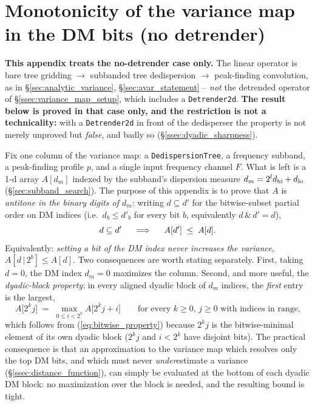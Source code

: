 \documentclass{article}
\numberwithin{equation}{section}   %
\begin{document}
\clearpage

\section{Monotonicity of the variance map in the DM bits (no detrender)}
\label{sec:dyadic_block}

{\bf This appendix treats the no-detrender case only.} The linear operator is bare tree
gridding $\to$ subbanded tree dedispersion $\to$ peak-finding convolution, as in
\S\ref{sec:analytic_variance}, \S\ref{sec:avar_statement} -- {\em not} the detrended
operator of \S\ref{ssec:variance_map_setup}, which includes a {\tt Detrender2d}.
{\bf The result below is proved in that case only, and the restriction is not a
technicality:} with a {\tt Detrender2d} in front of the dedisperser the property is not
merely unproved but {\em false}, and badly so (\S\ref{ssec:dyadic_sharpness}).

Fix one column of the variance map: a {\tt DedispersionTree}, a frequency subband, a
peak-finding profile $p$, and a single input frequency channel $F$. What is left is a 1-d
array $A[d_m]$ indexed by the subband's dispersion measure
$d_m = 2^l d_{\rm hi} + d_{\rm lo}$ (\S\ref{sec:subband_search}). The purpose of this
appendix is to prove that $A$ is {\em antitone in the binary digits of $d_m$}: writing
$d \subseteq d'$ for the bitwise-subset partial order on DM indices (i.e.\ $d_b \le d'_b$
for every bit $b$, equivalently $d \,\&\, d' = d$),
\begin{equation}
d \subseteq d' \hspace{5mm} \Longrightarrow \hspace{5mm} A[d'] \;\le\; A[d].
\label{eq:bitwise_property}
\end{equation}
Equivalently: {\em setting a bit of the DM index never increases the variance},
$A[d \,|\, 2^b] \le A[d]$. Two consequences are worth stating separately. First, taking
$d = 0$, the DM index $d_m=0$ maximizes the column. Second, and more useful, the
{\em dyadic-block property}: in every aligned dyadic block of $d_m$ indices, the {\em first}
entry is the largest,
\begin{equation}
A\big[ 2^k j \big] \;=\; \max_{0 \le i < 2^k} A\big[ 2^k j + i \big]
  \qquad \mbox{for every $k \ge 0$, $j \ge 0$ with indices in range,}
\label{eq:dyadic_property}
\end{equation}
which follows from (\ref{eq:bitwise_property}) because $2^kj$ is the bitwise-minimal element
of its own dyadic block ($2^kj$ and $i < 2^k$ have disjoint bits). The practical consequence
is that an approximation to the variance map which resolves only the top DM bits, and which
must never {\em under}estimate a variance (\S\ref{ssec:distance_function}), can simply be
evaluated at the bottom of each dyadic DM block: no maximization over the block is needed,
and the resulting bound is tight.
\end{document}
